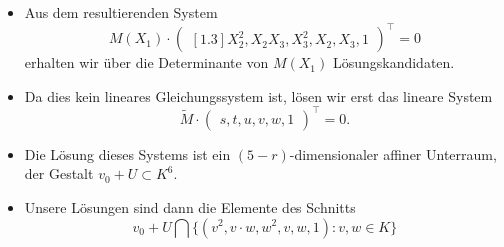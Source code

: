\documentclass[11pt]{beamer}
\theoremstyle{custom}
\theoremstyle{custom}
\begin{document}
	\begin{frame}
				\begin{itemize}
			\item Aus dem resultierenden System
			\begin{equation*}
				M(X_{1})\cdot\begin{pmatrix}[1.3]
					X_{2}^2,
					X_{2}X_{3},
					X_{3}^2,
					X_{2},
					X_{3},
					1
				\end{pmatrix}^\top=0
			\end{equation*}
			erhalten wir über die Determinante von $M(X_{1})$ Lösungskandidaten.
			\item Da dies kein lineares Gleichungssystem ist, lösen wir erst das lineare System
			\begin{equation*}\label{eqn:low_rank_system_ind}
				\tilde{M} \cdot\begin{pmatrix}
					s,
					t,
					u,
					v,
					w,
					1
				\end{pmatrix}^\top
				=0.
			\end{equation*}
			\item Die Lösung dieses Systems ist ein $(5-r)$-dimensionaler affiner Unterraum, der Gestalt ${v_0 + U \subset K^6}$.
			\item Unsere Lösungen sind dann die Elemente des Schnitts \begin{equation*}
				v_0 + U \bigcap \{(v^2,v\cdot w,w^2,v,w,1) : v,w \in K\}
			\end{equation*}
		\end{itemize}
	\end{frame}
\end{document}
